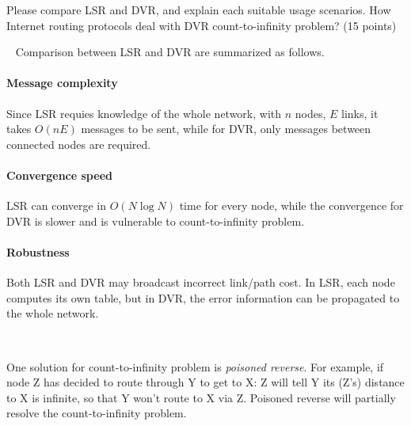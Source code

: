 \begin{exercise}[]{Please compare LSR and DVR, and explain each suitable usage scenarios. How
  Internet routing protocols deal with DVR count-to-infinity problem? (15 points)}
  \begin{solution}
  \par{~} Comparison between LSR and DVR are summarized as follows.
  \paragraph{Message complexity} Since LSR requies knowledge of the whole network, with $n$ nodes, $E$ links, it takes $O(nE)$ messages to be sent, while for DVR, only messages between connected nodes are required.
  \paragraph{Convergence speed} LSR can converge in $O(N\log N)$ time for every node, while the convergence for DVR is slower and is vulnerable to count-to-infinity problem.
  \paragraph{Robustness} Both LSR and DVR may broadcast incorrect link/path cost. In LSR, each node computes its own table, but in DVR, the error information can be propagated to the whole network.

  \par{~}

  One solution for count-to-infinity problem is \emph{poisoned reverse}. For example, if node Z  has decided to route through Y to get to X: 
  Z will tell Y its (Z’s) distance to X is infinite,  so that Y won’t route to X via Z. Poisoned reverse will partially resolve the count-to-infinity problem.
  \end{solution}
  \label{ex4}
\end{exercise}


